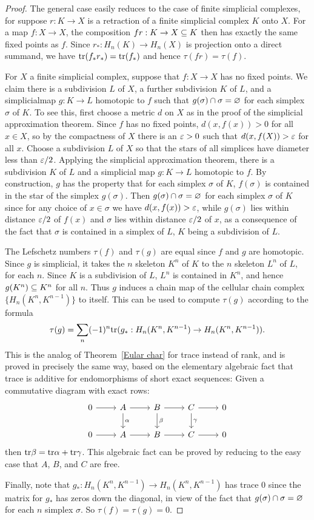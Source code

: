 \begin{proof}
The general case easily reduces to the case of finite simplicial complexes,
for suppose $r:K\to X$ is a retraction of a finite simplicial complex $K$ onto $X$. For a map $f:X\to X$, the composition $fr:K\to X\subseteq K$ then has exactly the same fixed points as $f$. Since $r_*:H_n(K)\to H_n(X)$ is projection onto a direct summand, we have $\mathrm{tr}(f_*r_*)=\mathrm{tr}(f_*)$ and hence $\tau(fr)=\tau(f)$.\par
For $X$ a finite simplicial complex, suppose that $f:X\to X$ has no fixed points. We claim there is a subdivision $L$ of $X$, a further subdivision $K$ of $L$, and a simplicialmap $g:K\to L$ homotopic to $f$ such that $g(\sigma)\cap\sigma=\varnothing$ for each simplex $\sigma$ of $K$. To see this, first choose a metric $d$ on $X$ as in the proof of the simplicial approximation theorem. Since $f$ has no fixed points, $d(x,f(x))>0$ for all $x\in X$, so by the compactness of $X$ there is an $\varepsilon>0$ such that $d(x,f(X))>\varepsilon$ for all $x$. Choose a subdivision $L$ of $X$ so that the stars of all simplices have diameter less than $\varepsilon/2$. Applying the simplicial approximation theorem, there is a subdivision $K$ of $L$ and a simplicial map $g:K\to L$ homotopic to $f$. By construction, $g$ has the property that for each simplex $\sigma$ of $K$, $f(\sigma)$ is contained in the star of the simplex $g(\sigma)$. Then $g(\sigma)\cap\sigma=\varnothing$ for each simplex $\sigma$ of $K$ since for any choice of $x\in\sigma$ we have $d(x,f(x))>\varepsilon$, while $g(\sigma)$ lies within distance $\varepsilon/2$ of $f(x)$ and $\sigma$ lies within distance $\varepsilon/2$ of $x$, as a consequence of the fact that $\sigma$ is contained in a simplex of $L$, $K$ being a subdivision of $L$.\par
The Lefschetz numbers $\tau(f)$ and $\tau(g)$ are equal since $f$ and $g$ are homotopic. Since $g$ is simplicial, it takes the $n$ skeleton $K^n$ of $K$ to the $n$ skeleton $L^n$ of $L$, for each $n$. Since $K$ is a subdivision of $L$, $L^n$ is contained in $K^n$, and hence $g(K^n)\subseteq K^n$ for all $n$. Thus $g$ induces a chain map of the cellular chain complex $\{H_n(K^n,K^{n-1})\}$ to itself. This can be used to compute $\tau(g)$ according to the formula
\[\tau(g)=\sum_n(-1)^n\mathrm{tr}(g_*:H_n(K^n,K^{n-1})\to H_n(K^n,K^{n-1})).\]
This is the analog of Theorem~\ref{Eular char} for trace instead of rank, and is proved in precisely the same way, based on the elementary algebraic fact that trace is additive for endomorphisms of short exact sequences: Given a commutative diagram with exact rows:
\[\begin{tikzcd}
0\ar[r]&A\ar[r]\ar[d,"\alpha"]&B\ar[r]\ar[d,"\beta"]&C\ar[r]\ar[d,"\gamma"]&0\\
0\ar[r]&A\ar[r]&B\ar[r]&C\ar[r]&0
\end{tikzcd}\] then $\mathrm{tr}\beta=\mathrm{tr}\alpha+\mathrm{tr}\gamma$. This algebraic fact can be
proved by reducing to the easy case that $A$, $B$, and $C$ are free.\par
Finally, note that $g_*:H_n(K^n,K^{n-1})\to H_n(K^n,K^{n-1})$ has trace $0$ since the matrix for $g_*$ has zeros down the diagonal, in view of the fact that $g(\sigma)\cap\sigma=\varnothing$ for each $n$ simplex $\sigma$. So $\tau(f)=\tau(g)=0$.
\end{proof}
